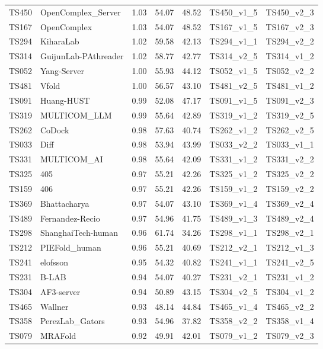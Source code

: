 \begin{longtable}{lllllll}
TS450 & OpenComplex\_Server & 1.03 & 54.07 & 48.52 & TS450\_v1\_5 & TS450\_v2\_3 \\ 
TS167 & OpenComplex & 1.03 & 54.07 & 48.52 & TS167\_v1\_5 & TS167\_v2\_3 \\ 
TS294 & KiharaLab & 1.02 & 59.58 & 42.13 & TS294\_v1\_1 & TS294\_v2\_2 \\ 
TS314 & GuijunLab-PAthreader & 1.02 & 58.77 & 42.77 & TS314\_v2\_5 & TS314\_v1\_2 \\ 
TS052 & Yang-Server & 1.00 & 55.93 & 44.12 & TS052\_v1\_5 & TS052\_v2\_2 \\ 
TS481 & Vfold & 1.00 & 56.57 & 43.10 & TS481\_v2\_5 & TS481\_v1\_2 \\ 
TS091 & Huang-HUST & 0.99 & 52.08 & 47.17 & TS091\_v1\_5 & TS091\_v2\_3 \\ 
TS319 & MULTICOM\_LLM & 0.99 & 55.64 & 42.89 & TS319\_v1\_2 & TS319\_v2\_5 \\ 
TS262 & CoDock & 0.98 & 57.63 & 40.74 & TS262\_v1\_2 & TS262\_v2\_5 \\ 
TS033 & Diff & 0.98 & 53.94 & 43.99 & TS033\_v2\_2 & TS033\_v1\_1 \\ 
TS331 & MULTICOM\_AI & 0.98 & 55.64 & 42.09 & TS331\_v1\_2 & TS331\_v2\_2 \\ 
TS325 & 405 & 0.97 & 55.21 & 42.26 & TS325\_v1\_2 & TS325\_v2\_2 \\ 
TS159 & 406 & 0.97 & 55.21 & 42.26 & TS159\_v1\_2 & TS159\_v2\_2 \\ 
TS369 & Bhattacharya & 0.97 & 54.07 & 43.10 & TS369\_v1\_4 & TS369\_v2\_4 \\ 
TS489 & Fernandez-Recio & 0.97 & 54.96 & 41.75 & TS489\_v1\_3 & TS489\_v2\_4 \\ 
TS298 & ShanghaiTech-human & 0.96 & 61.74 & 34.26 & TS298\_v1\_1 & TS298\_v2\_1 \\ 
TS212 & PIEFold\_human & 0.96 & 55.21 & 40.69 & TS212\_v2\_1 & TS212\_v1\_3 \\ 
TS241 & elofsson & 0.95 & 54.32 & 40.82 & TS241\_v1\_1 & TS241\_v2\_5 \\ 
TS231 & B-LAB & 0.94 & 54.07 & 40.27 & TS231\_v2\_1 & TS231\_v1\_2 \\ 
TS304 & AF3-server & 0.94 & 50.89 & 43.15 & TS304\_v2\_5 & TS304\_v1\_2 \\ 
TS465 & Wallner & 0.93 & 48.14 & 44.84 & TS465\_v1\_4 & TS465\_v2\_2 \\ 
TS358 & PerezLab\_Gators & 0.93 & 54.96 & 37.82 & TS358\_v2\_2 & TS358\_v1\_4 \\ 
TS079 & MRAFold & 0.92 & 49.91 & 42.01 & TS079\_v1\_2 & TS079\_v2\_3 \\ 

\end{longtable}
